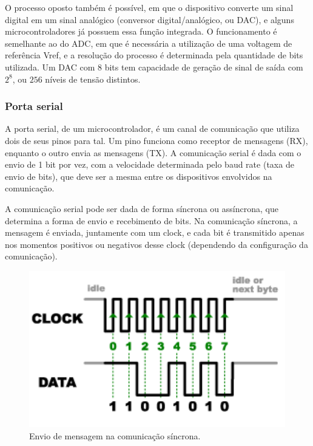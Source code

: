 O processo oposto também é possível, em que o dispositivo converte um sinal digital em um sinal analógico (conversor digital/analógico, ou DAC), e alguns microcontroladores já possuem essa função integrada. O funcionamento é semelhante ao do ADC, em que é necessária a utilização de uma voltagem de referência Vref, e a resolução do processo é determinada pela quantidade de bits utilizada. Um DAC com 8 bits tem capacidade de geração de sinal de saída com \( 2^8 \), ou \(256\) níveis de tensão distintos.

\subsubsection{Porta serial}

A porta serial, de um microcontrolador, é um canal de comunicação que utiliza dois de seus pinos para tal. Um pino funciona como receptor de mensagens (RX), enquanto o outro envia as mensagens (TX). A comunicação serial é dada com o envio de 1 bit por vez, com a velocidade determinada pelo baud rate (taxa de envio de bits), que deve ser a mesma entre os dispositivos envolvidos na comunicação.

A comunicação serial pode ser dada de forma síncrona ou assíncrona, que determina a forma de envio e recebimento de bits. Na comunicação síncrona, a mensagem é enviada, juntamente com um clock, e cada bit é transmitido apenas nos momentos positivos ou negativos desse clock (dependendo da configuração da comunicação).

\begin{figure}[ht]
    \begin{center}
    \includegraphics{figuras/sincrono.PNG}
    \end{center}
    \caption[Comunicação síncrona]{Envio de mensagem na comunicação síncrona.}
    \label{sincrono}
\end{figure}

